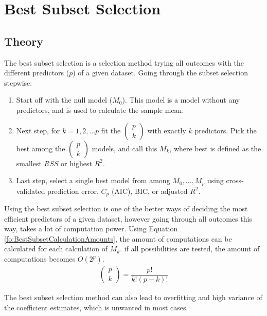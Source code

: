 \section{Best Subset Selection}
\subsection{Theory}
The best subset selection is a selection method trying all outcomes with the different predictors ($p$) of a given dataset. Going through the subset selection stepwise:
\begin{enumerate}
	\item Start off with the null model ($M_0$). This model is a model without any predictors, and is used to calculate the sample mean. 
	\item Next step, for $k = 1, 2, \dots p$ fit the $( \begin{smallmatrix} p \\ k \end{smallmatrix} )$ with exactly $k$ predictors. Pick the best among the $( \begin{smallmatrix} p \\ k \end{smallmatrix} )$ models, and call this $M_k$, where best is defined as the smallest $RSS$ or highest $R^2$.
	\item Last step, select a single best model from among $M_0,\dots,M_p$ using cross-validated prediction error, $C_p$ (AIC), BIC, or adjusted $R^2$.
\end{enumerate}
 
Using the best subset selection is one of the better ways of deciding the most efficient predictors of a given dataset, however going through all outcomes this way, takes a lot of computation power. Using Equation \ref{fo:BestSubsetCalculationAmounts}, the amount of computations can be calculated for each calculation of $M_k$. if all possibilities are tested, the amount of computations becomes $O(2^p)$.
\begin{align}\label{fo:BestSubsetCalculationAmounts}
	\begin{pmatrix}
		p \\ k
	\end{pmatrix}
	= \dfrac{p!}{k!(p-k)!}
\end{align}

The best subset selection method can also lead to overfitting and high variance of the coefficient estimates, which is unwanted in most cases. 

